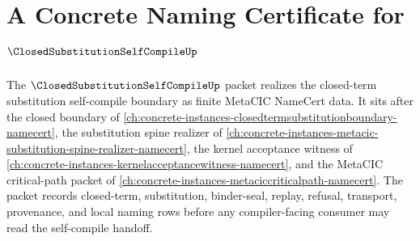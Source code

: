 \chapter{A Concrete Naming Certificate for $\ClosedSubstitutionSelfCompileUp$}
\label{ch:concrete-instances-closed-substitution-self-compile-namecert}

The $\ClosedSubstitutionSelfCompileUp$ packet realizes the closed-term substitution self-compile boundary as finite MetaCIC NameCert data. It sits after the closed boundary of \autoref{ch:concrete-instances-closedtermsubstitutionboundary-namecert}, the substitution spine realizer of \autoref{ch:concrete-instances-metacic-substitution-spine-realizer-namecert}, the kernel acceptance witness of \autoref{ch:concrete-instances-kernelacceptancewitness-namecert}, and the MetaCIC critical-path packet of \autoref{ch:concrete-instances-metaciccriticalpath-namecert}. The packet records closed-term, substitution, binder-seal, replay, refusal, transport, provenance, and local naming rows before any compiler-facing consumer may read the self-compile handoff.

